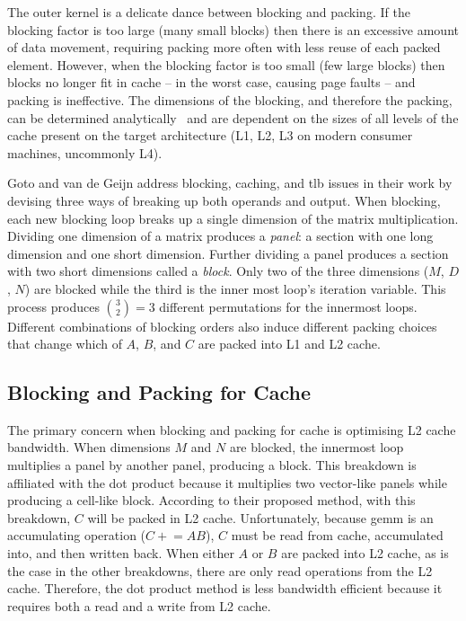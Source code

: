 \documentclass[\main/thesis.tex]{subfiles}
\begin{document}
The outer kernel is a delicate dance between blocking and packing.
If the blocking factor is too large (\ie many small blocks) then there is an excessive amount of data movement, requiring packing more often with less reuse of each packed element.
However, when the blocking factor is too small (\ie few large blocks) then blocks no longer fit in cache -- in the worst case, causing page faults -- and packing is ineffective.
The dimensions of the blocking, and therefore the packing, can be determined analytically~\autocite{low2016analytical} and are dependent on the sizes of all levels of the cache present on the target architecture (L1, L2, L3 on modern consumer machines, uncommonly L4).

Goto and van de Geijn address blocking, caching, and \gls{tlb} issues in their work by devising three ways of breaking up both operands and output.
When blocking, each new blocking loop breaks up a single dimension of the matrix multiplication.
Dividing one dimension of a matrix produces a \emph{panel}: a section with one long dimension and one short dimension.
Further dividing a panel produces a section with two short dimensions called a \emph{block}.
Only two of the three dimensions ($M$, $D$, $N$) are blocked while the third is the inner most loop's iteration variable.
This process produces $\binom{3}{2}=3$ different permutations for the innermost loops\footnotemark.
Different combinations of blocking orders also induce different packing choices that change which of $A$, $B$, and $C$ are packed into L1 and L2 cache.

\subsection{Blocking and Packing for Cache}
\label{sec:blockPack}
The primary concern when blocking and packing for cache is optimising L2 cache bandwidth.
When dimensions $M$ and $N$ are blocked, the innermost loop multiplies a panel by another panel, producing a block.
This breakdown is affiliated with the dot product because it multiplies two vector-like panels while producing a cell-like block.
According to their proposed method, with this breakdown, $C$ will be packed in L2 cache.
Unfortunately, because \gls{gemm} is an accumulating operation (\eg $C \mathrel{+}= AB$), $C$ must be read from cache, accumulated into, and then written back.
When either $A$ or $B$ are packed into L2 cache, as is the case in the other breakdowns, there are only read operations from the L2 cache.
Therefore, the dot product method is less bandwidth efficient because it requires both a read and a write from L2 cache.
\end{document}
